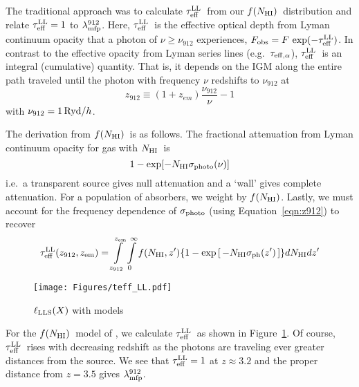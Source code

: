 \documentclass[graybox]{svmult}
\def\ltk{\left [ \,}
\def\rtk{\, \right  ] }
\def\intl{\int\limits}
\newcommand{\mnhi}{N_{\rm HI}}
\newcommand{\nhi}{$\mnhi$}
\def\mfnhi{f(\mnhi)}
\def\fnhi{$\mfnhi$}
\def\mlmfp{\lambda_{\rm mfp}^{912}}
\def\lmfp{$\mlmfp$}
\def\mtll{\tau_{\rm eff}^{\rm LL}}
\def\tll{$\mtll$}
\begin{document}
The traditional approach was to calculate \tll\ from our 
\fnhi\ distribution and relate $\mtll=1$ to \lmfp.
Here, \tll\ is the effective optical depth from Lyman continuum opacity
that a photon of $\nu \ge \nu_{912}$ experiences, 
$F_{\rm obs} = F \, \exp(-\mtll)$.
In contrast to the effective opacity from Lyman series lines
(e.g.\ $\tau_{\rm eff,\alpha}$), \tll\ is
an integral (cumulative) quantity.
That is, it depends on the IGM along the entire path traveled
until the photon with frequency $\nu$
redshifts to $\nu_{912}$ at 
\begin{equation}
z_{912} \equiv (1+z_{em}) \frac{\nu_{912}}{\nu}  - 1
\label{eqn:z912}
\end{equation}
with $\nu_{912} = {\rm 1\,Ryd}/h$.

The derivation from \fnhi\ is as follows.
The fractional attenuation from Lyman continuum opacity
for gas with \nhi\ is
\begin{equation}
1 - \exp [-\mnhi \sigma_{\rm photo}(\nu)]
\end{equation}
i.e.\ a transparent source gives null attenuation and 
a `wall' gives complete attenuation.
For a population of absorbers, we weight by 
\fnhi. Lastly, we 
must account for the frequency dependence of $\sigma_{\rm photo}$
(using Equation~\ref{eqn:z912}) to recover
\begin{equation}
\mtll(z_{912},z_{\rm em}) = \intl_{z_{912}}^{z_{\rm em}} \intl_0^\infty f(\mnhi,z')
   \lbrace 1 - \exp \ltk - \mnhi \sigma_{\rm ph}(z') \rtk \rbrace d\mnhi dz' 
\label{eqn:teff}
\end{equation}

%
\begin{figure}[b]
\sidecaption
\texttt{[image: Figures/teff\_LL.pdf]}
%
%
\caption{$\ell_{\rm LLS}(X)$ with models
}
\label{fig:teff_LL}       %
\end{figure}

For the \fnhi\ model of \cite{pro+14}, we calculate \tll\
as shown in Figure~\ref{fig:teff_LL}.
Of course, \tll\ rises with decreasing redshift as the photons
are traveling ever greater distances from the source.
We see that $\mtll = 1$ at $z \approx 3.2$ and the proper
distance from $z=3.5$ gives \lmfp.
\end{document}
